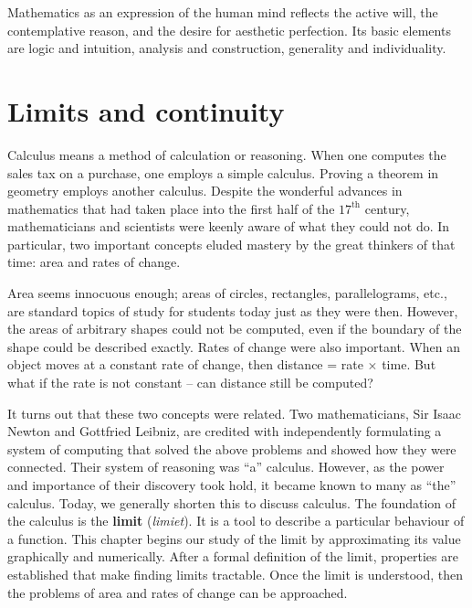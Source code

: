 \begin{savequote}[75mm]
Mathematics as an expression of the human mind reflects the active will, the contemplative reason, and the desire for aesthetic perfection. Its basic elements are logic and intuition, analysis and construction, generality and individuality.

\end{savequote}


\chapter{Limits and continuity}
\label{chap_limits}
\graphicspath{{figures/Lim/}}

\ifcourse
Calculus means a method of calculation or reasoning.  When one computes the sales tax on a purchase, one employs a simple calculus.  Proving a theorem in geometry employs another calculus. Despite the wonderful advances in mathematics that had taken place into the first half of the $17^\text{th}$ century, mathematicians and scientists were keenly aware of what they could not do. In particular, two important concepts eluded mastery by the great thinkers of that time: area and rates of change. 

Area seems innocuous enough; areas of circles, rectangles, parallelograms, etc., are standard topics of study for students today just as they were then. However, the areas of arbitrary shapes could not be computed, even if the boundary of the shape could be described exactly. Rates of change were also important. When an object moves at a constant rate of change, then distance = rate $\times $ time. But what if the rate is not constant -- can distance still be computed? 

It turns out that these two concepts were related. Two mathematicians, Sir Isaac Newton and Gottfried Leibniz, are credited with independently formulating a system of computing that solved the above problems and showed how they were connected. Their system of reasoning was ``a'' calculus. However, as the power and importance of their discovery took hold, it became known to many as ``the'' calculus. Today, we generally shorten this to discuss calculus.
\fi
The foundation of the calculus is the \textbf{limit} (\textit{limiet}). It is a tool to describe a particular behaviour of a function. This chapter begins our study of the limit by approximating its value graphically and numerically. After a formal definition of the limit, properties are established that make finding limits tractable. Once the limit is understood, then the problems of area and rates of change can be approached.

